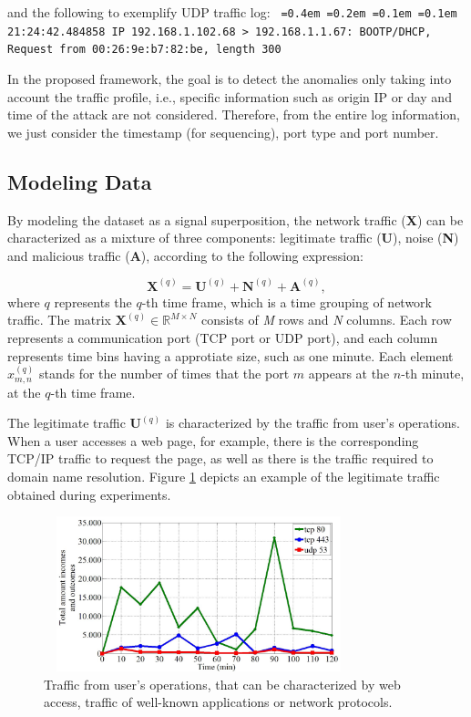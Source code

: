 \documentclass[review]{elsarticle}
\newcommand*\justify{%
	\fontdimen2\font=0.4em%
	\fontdimen3\font=0.2em%
	\fontdimen4\font=0.1em%
	\fontdimen7\font=0.1em%
}
\begin{document}
and the following to exemplify UDP traffic log: 
\newline
\newline
\texttt{\justify21:24:42.484858 IP 192.168.1.102.68 > 192.168.1.1.67: BOOTP/DHCP, Request from 00:26:9e:b7:82:be, length 300}
\newline 

In the proposed framework, the goal is to detect the anomalies only taking into account the traffic profile, i.e., specific information such as origin IP or day and time of the attack are not considered. Therefore, from the entire log information, we just consider the timestamp (for sequencing), port type and port number.

\subsection{Modeling Data}
\label{sec:ModelingData}

By modeling the dataset as a signal superposition, the network traffic (\textbf{X}) can be characterized as a mixture of three components: legitimate traffic (\textbf{U}), noise (\textbf{N}) and malicious traffic (\textbf{A}), according to the following expression:

\begin{equation}\label{eq:eq01}
\boldsymbol{X}^{(q)} = \boldsymbol{U}^{(q)} + \boldsymbol{N}^{(q)} + \boldsymbol{A}^{(q)},
\end{equation}
where $q$ represents the $q$-th time frame, which is a time grouping of network traffic. The matrix $\boldsymbol{X}^{(q)} \in \mathbb{R}^{M \times N}$ consists of \emph{M} rows and \emph{N} columns. Each row represents a communication port (TCP port or UDP port), and each column represents time bins having a approtiate size, such as one minute. Each element $x_{m,n}^{(q)}$ stands for the number of times that the port $m$ appears at the $n$-th minute, at the $q$-th time frame.

The legitimate traffic $\boldsymbol{U}^{(q)}$ is characterized by the traffic from user's operations. When a user accesses a web page, for example, there is the corresponding TCP/IP traffic to request the page, as well as there is the traffic required to domain name resolution. Figure \ref{fig:fig3} depicts an example of the legitimate traffic obtained during experiments.

\begin{figure}[h!]
     \centering 
     \includegraphics[height=4.5cm, width=9cm]{results/figures/fig03.png}
     \caption{Traffic from user's operations, that can be characterized by web access, traffic of well-known applications or network protocols.}
     \label{fig:fig3}
\end{figure}
\end{document}

